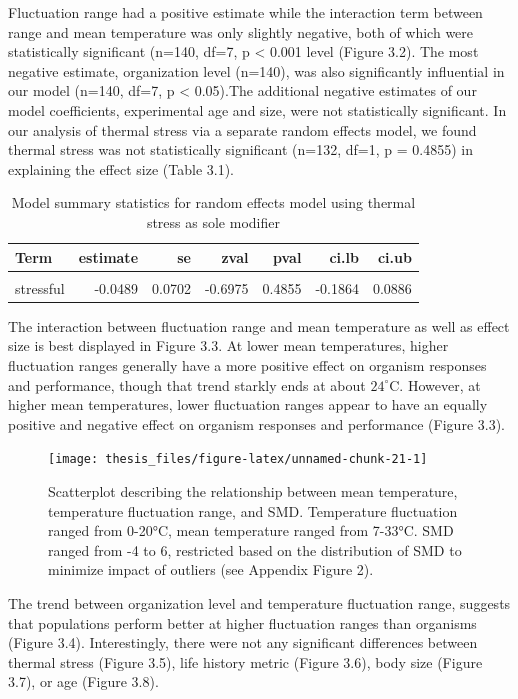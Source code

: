 \documentclass[12pt,twoside]{reedthesis}
\begin{document}
Fluctuation range had a positive estimate while the interaction term between range and mean temperature was only slightly negative, both of which were statistically significant (n=140, df=7, p \textless{} 0.001 level (Figure 3.2). The most negative estimate, organization level (n=140), was also significantly influential in our model (n=140, df=7, p \textless{} 0.05).The additional negative estimates of our model coefficients, experimental age and size, were not statistically significant. In our analysis of thermal stress via a separate random effects model, we found thermal stress was not statistically significant (n=132, df=1, p = 0.4855) in explaining the effect size (Table 3.1).
\begin{table}[!h]

\caption[Thermal stress model summary statistics]{\label{tab:unnamed-chunk-20}Model summary statistics for random effects model using thermal stress as sole modifier}
\centering
\begin{tabular}[t]{lrrrrrr}
\toprule
\textbf{Term} & \textbf{estimate} & \textbf{se} & \textbf{zval} & \textbf{pval} & \textbf{ci.lb} & \textbf{ci.ub}\\
\midrule
\cellcolor{gray!6}{intercept} & \cellcolor{gray!6}{0.2050} & \cellcolor{gray!6}{0.1846} & \cellcolor{gray!6}{1.1104} & \cellcolor{gray!6}{0.2668} & \cellcolor{gray!6}{-0.1568} & \cellcolor{gray!6}{0.5669}\\
stressful & -0.0489 & 0.0702 & -0.6975 & 0.4855 & -0.1864 & 0.0886\\
\bottomrule
\end{tabular}
\end{table}
\clearpage

The interaction between fluctuation range and mean temperature as well as effect size is best displayed in Figure 3.3. At lower mean temperatures, higher fluctuation ranges generally have a more positive effect on organism responses and performance, though that trend starkly ends at about \(24^{\circ}\)C. However, at higher mean temperatures, lower fluctuation ranges appear to have an equally positive and negative effect on organism responses and performance (Figure 3.3).
\begin{figure}

{\centering \texttt{[image: thesis\_files/figure-latex/unnamed-chunk-21-1]} 

}

\caption[Scatterplot of relationship between range, mean, and SMD]{Scatterplot describing the relationship between mean temperature, temperature fluctuation range, and SMD. Temperature fluctuation ranged from 0-20°C, mean temperature ranged from 7-33°C. SMD ranged from -4 to 6, restricted based on the distribution of SMD to minimize impact of outliers (see Appendix Figure 2).}\label{fig:unnamed-chunk-21}
\end{figure}
The trend between organization level and temperature fluctuation range, suggests that populations perform better at higher fluctuation ranges than organisms (Figure 3.4). Interestingly, there were not any significant differences between thermal stress (Figure 3.5), life history metric (Figure 3.6), body size (Figure 3.7), or age (Figure 3.8).
\end{document}
